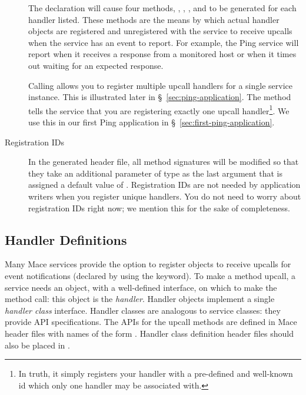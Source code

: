 \begin{description}
  The  declaration will cause four methods,
  , ,
  , and  to be
  generated for each handler listed.  These methods are the means by which
  actual handler objects are registered and unregistered with the service to
  receive upcalls when the service has an event to report.  For example, the
  Ping service will report when it receives a response from a monitored host or
  when it times out waiting for an expected response.

  Calling  allows you to register multiple upcall
  handlers for a single service instance.  This is illustrated later in
  \S~\ref{sec:ping-application}.  The  method
  tells the service that you are registering exactly one upcall
  handler\footnote{In truth, it simply registers your handler with a
  pre-defined and well-known id which only one handler may be associated
  with.}.  We use this in our first Ping application in
  \S~\ref{sec:first-ping-application}.

\item[Registration IDs] In the generated header file, all method
  signatures will be modified so that they take an additional parameter of type
   as the last argument that is assigned a
  default value of .  Registration IDs are not needed by
  application writers when you register unique handlers.  You do not need to
  worry about registration IDs right now; we mention this for the sake of
  completeness.

\end{description}


\subsection{Handler Definitions}
\label{sec:handler-def}

Many Mace services provide the option to register objects to receive
upcalls for event notifications (declared by using the
 keyword).  To make a method upcall, a service
needs an object, with a well-defined interface, on which to make the
method call: this object is the \emph{handler}.  Handler objects
implement a single \emph{handler class} interface.  Handler classes
are analogous to service classes: they provide API specifications.
The APIs for the upcall methods are defined in Mace header files
with names of the form .
Handler class definition header files should also be placed in
.


